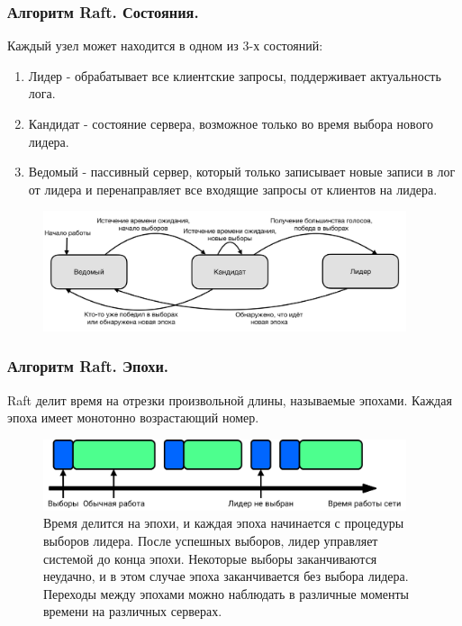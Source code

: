\documentclass[pdf, 10pt, unicode,aspectratio=169]{beamer} %
\begin{document}
\begin{frame}
\frametitle{Алгоритм Raft. Состояния.}


Каждый узел может находится в одном из 3-х состояний:
\begin{enumerate}
\item Лидер - обрабатывает все клиентские запросы, поддерживает актуальность лога.
\item Кандидат - состояние сервера, возможное только во время выбора нового лидера.
\item Ведомый - пассивный сервер, который только записывает новые записи в лог от лидера и перенаправляет все входящие запросы от клиентов на лидера.
\end{enumerate}

\begin{figure}[H]
\centering
\includegraphics[width=0.95\textwidth]{src/pics/states.png}
\label{fig:states}
\end{figure}


\end{frame}


\begin{frame}
\frametitle{Алгоритм Raft. Эпохи.}


Raft делит время на отрезки произвольной длины, называемые эпохами. Каждая эпоха имеет монотонно возрастающий номер. 

\begin{figure}[H]
\centering
\vspace{0.4cm}
\hspace*{0.2cm}
\includegraphics[width=0.95\textwidth]{src/pics/terms.png}
\caption{Время делится на эпохи, и каждая эпоха начинается с процедуры выборов лидера. После успешных выборов, лидер управляет системой до конца эпохи. Некоторые выборы заканчиваются неудачно, и в этом случае эпоха заканчивается без выбора лидера. Переходы между эпохами можно наблюдать в различные моменты времени на различных серверах.}
\label{fig:terms}
\end{figure}

\end{frame}
\end{document}
